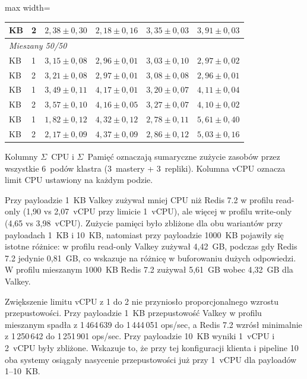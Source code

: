 \begin{table}[!htbp]
\begin{adjustbox}{max width=\textwidth}
\begin{tabular}{llrrrr}
\quad 1000 KB & 2 & $2{,}38 \pm 0{,}30$ & $2{,}18 \pm 0{,}16$ & $3{,}35 \pm 0{,}03$ & $3{,}91 \pm 0{,}03$ \\
\midrule
\multicolumn{6}{l}{\textit{Mieszany 50/50}} \\
\quad 1 KB & 1 & $3{,}15 \pm 0{,}08$ & $2{,}96 \pm 0{,}01$ & $3{,}03 \pm 0{,}10$ & $2{,}97 \pm 0{,}02$ \\
\quad 1 KB & 2 & $3{,}21 \pm 0{,}08$ & $2{,}97 \pm 0{,}01$ & $3{,}08 \pm 0{,}08$ & $2{,}96 \pm 0{,}01$ \\
\quad 10 KB & 1 & $3{,}49 \pm 0{,}11$ & $4{,}17 \pm 0{,}01$ & $3{,}20 \pm 0{,}07$ & $4{,}11 \pm 0{,}04$ \\
\quad 10 KB & 2 & $3{,}57 \pm 0{,}10$ & $4{,}16 \pm 0{,}05$ & $3{,}27 \pm 0{,}07$ & $4{,}10 \pm 0{,}02$ \\
\quad 1000 KB & 1 & $1{,}82 \pm 0{,}12$ & $4{,}32 \pm 0{,}12$ & $2{,}78 \pm 0{,}11$ & $5{,}61 \pm 0{,}40$ \\
\quad 1000 KB & 2 & $2{,}17 \pm 0{,}09$ & $4{,}37 \pm 0{,}09$ & $2{,}86 \pm 0{,}12$ & $5{,}03 \pm 0{,}16$ \\
\bottomrule
\end{tabular}
\end{adjustbox}
\end{table}

\FloatBarrier

Kolumny $\Sigma$~CPU i $\Sigma$~Pamięć oznaczają sumaryczne zużycie zasobów przez wszystkie 6~podów klastra (3~mastery + 3~repliki). Kolumna vCPU oznacza limit CPU ustawiony na każdym podzie.

Przy payloadzie 1~KB Valkey zużywał mniej CPU niż Redis 7.2 w profilu read-only (1{,}90 vs 2{,}07~vCPU przy limicie 1~vCPU), ale więcej w profilu write-only (4{,}65 vs 3{,}98~vCPU). Zużycie pamięci było zbliżone dla obu wariantów przy payloadach 1~KB i 10~KB, natomiast przy payloadzie 1000~KB pojawiły się istotne różnice: w profilu read-only Valkey zużywał 4{,}42~GB, podczas gdy Redis 7.2 jedynie 0{,}81~GB, co wskazuje na różnicę w buforowaniu dużych odpowiedzi. W profilu mieszanym 1000~KB Redis 7.2 zużywał 5{,}61~GB wobec 4{,}32~GB dla Valkey.

Zwiększenie limitu vCPU z 1 do 2 nie przyniosło proporcjonalnego wzrostu przepustowości. Przy payloadzie 1~KB przepustowość Valkey w profilu mieszanym spadła z 1\,464\,639 do 1\,444\,051 ops/sec, a Redis 7.2 wzrósł minimalnie z 1\,250\,642 do 1\,251\,901 ops/sec. Przy payloadzie 10~KB wyniki 1~vCPU i 2~vCPU były zbliżone. Wskazuje to, że przy tej konfiguracji klienta i pipeline 10 oba systemy osiągały nasycenie przepustowości już przy 1~vCPU dla payloadów 1--10~KB.

